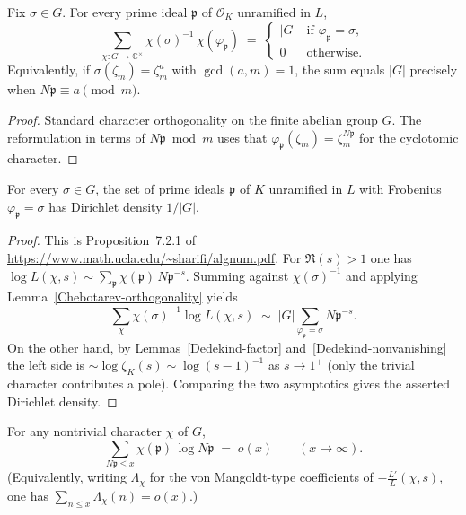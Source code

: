 \begin{lemma}\label{Chebotarev-orthogonality}
Fix $\sigma \in G$.  For every prime ideal $\mathfrak{p}$ of $\mathcal{O}_K$ unramified in $L$,
\[
\sum_{\chi : G \to \mathbb{C}^\times} \chi(\sigma)^{-1}\,\chi(\varphi_{\mathfrak{p}})
\;=\;
\begin{cases}
|G| & \text{if }\varphi_{\mathfrak{p}} = \sigma,\\
0 & \text{otherwise.}
\end{cases}
\]
Equivalently, if $\sigma(\zeta_m) = \zeta_m^a$ with $\gcd(a,m)=1$, the sum equals $|G|$
precisely when $N\mathfrak{p} \equiv a \pmod{m}$.
\end{lemma}
\begin{proof}
Standard character orthogonality on the finite abelian group $G$.  The reformulation in terms
of $N\mathfrak{p} \bmod m$ uses that $\varphi_{\mathfrak{p}}(\zeta_m) = \zeta_m^{N\mathfrak{p}}$
for the cyclotomic character.
\end{proof}
\begin{proposition}\label{Chebotarev-cyclotomic-density}
For every $\sigma \in G$, the set of prime ideals $\mathfrak{p}$ of $K$ unramified in $L$ with
Frobenius $\varphi_{\mathfrak{p}} = \sigma$ has Dirichlet density $1/|G|$.
\end{proposition}
\begin{proof}
This is Proposition~7.2.1 of \url{https://www.math.ucla.edu/~sharifi/algnum.pdf}.  For
$\Re(s)>1$ one has $\log L(\chi,s) \sim \sum_{\mathfrak{p}} \chi(\mathfrak{p})\, N\mathfrak{p}^{-s}$.
Summing against $\chi(\sigma)^{-1}$ and applying Lemma~\ref{Chebotarev-orthogonality} yields
\[
\sum_{\chi} \chi(\sigma)^{-1} \log L(\chi,s)
\;\sim\;
|G| \sum_{\varphi_{\mathfrak{p}}=\sigma} N\mathfrak{p}^{-s}.
\]
On the other hand, by Lemmas~\ref{Dedekind-factor} and~\ref{Dedekind-nonvanishing} the left
side is $\sim \log\zeta_K(s) \sim \log(s-1)^{-1}$ as $s\to 1^+$ (only the trivial character
contributes a pole).  Comparing the two asymptotics gives the asserted Dirichlet density.
\end{proof}
\begin{lemma}\label{Dedekind-PNT}
For any nontrivial character $\chi$ of $G$,
\[
\sum_{N\mathfrak{p} \leq x} \chi(\mathfrak{p})\, \log N\mathfrak{p} \;=\; o(x)
\qquad(x\to\infty).
\]
(Equivalently, writing $\Lambda_\chi$ for the von Mangoldt-type coefficients of $-\frac{L'}{L}(\chi,s)$,
one has $\sum_{n\leq x} \Lambda_\chi(n) = o(x)$.)
\end{lemma}

